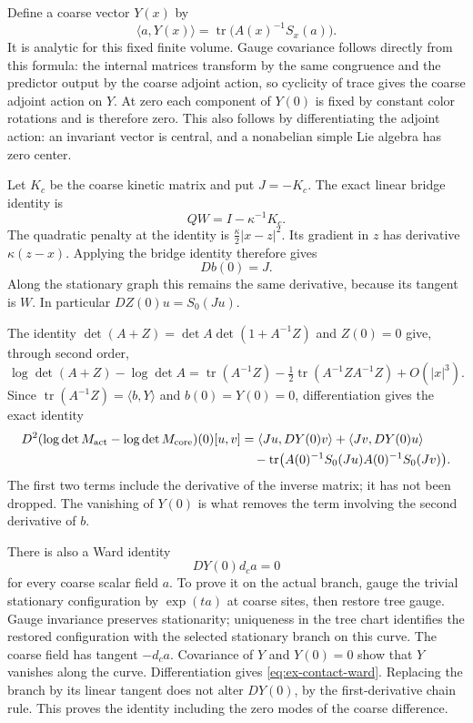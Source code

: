 Define a coarse vector $Y(x)$ by
\[
 \langle a,Y(x)\rangle=\operatorname{tr}\bigl(A(x)^{-1}S_x(a)\bigr).
\]
It is analytic for this fixed finite volume. Gauge covariance follows
directly from this formula: the internal matrices transform by the
same congruence and the predictor output by the coarse adjoint action,
so cyclicity of trace gives the coarse adjoint action on $Y$.
At zero each component of $Y(0)$ is fixed by constant color rotations
and is therefore zero. This also follows by differentiating the adjoint
action: an invariant vector is central, and a nonabelian simple Lie
algebra has zero center.

Let $K_c$ be the coarse kinetic matrix and put $J=-K_c$. The exact
linear bridge identity is
\[
                   QW=I-\kappa^{-1}K_c.
\]
The quadratic penalty at the identity is
$\frac\kappa2|x-z|^2$. Its gradient in $z$ has derivative
$\kappa(z-x)$. Applying the bridge identity therefore gives
\begin{equation}\label{eq:ex-penalty-gradient-derivative}
                              Db(0)=J.
\end{equation}
Along the stationary graph this remains the same derivative, because
its tangent is $W$. In particular $DZ(0)u=S_0(Ju)$.

The identity $\det(A+Z)=\det A\det(1+A^{-1}Z)$ and $Z(0)=0$
give, through second order,
\[
 \log\det(A+Z)-\log\det A
 =\operatorname{tr}(A^{-1}Z)
             -\tfrac12\operatorname{tr}(A^{-1}ZA^{-1}Z)+O(|x|^3).
\]
Since $\operatorname{tr}(A^{-1}Z)=\langle b,Y\rangle$ and
$b(0)=Y(0)=0$, differentiation gives the exact identity
\begin{align}
 D^2(\log\det M_{\rm act}-\log\det M_{\rm core})(0)[u,v]
 &=\langle Ju,DY(0)v\rangle+\langle Jv,DY(0)u\rangle\notag\\
 &\quad-\operatorname{tr}\bigl(A(0)^{-1}S_0(Ju)
                         A(0)^{-1}S_0(Jv)\bigr).
 \label{eq:ex-contact-hessian}
\end{align}
The first two terms include the derivative of the inverse matrix;
it has not been dropped. The vanishing of $Y(0)$ is what removes
the term involving the second derivative of $b$.

There is also a Ward identity
\begin{equation}\label{eq:ex-contact-ward}
                             DY(0)d_ca=0
\end{equation}
for every coarse scalar field $a$. To prove it on the actual branch,
gauge the trivial stationary configuration by $\exp(ta)$ at coarse
sites, then restore tree gauge. Gauge invariance preserves stationarity;
uniqueness in the tree chart identifies the restored configuration with
the selected stationary branch on this curve. The coarse field has
tangent $-d_ca$. Covariance of $Y$ and $Y(0)=0$ show that $Y$ vanishes
along the curve. Differentiation gives
\eqref{eq:ex-contact-ward}. Replacing the branch by its linear tangent
does not alter $DY(0)$, by the first-derivative chain rule. This proves
the identity including the zero modes of the coarse difference.

